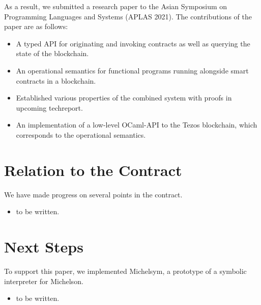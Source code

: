 \documentclass[a4paper,11pt]{article}
\begin{document}
\begin{itemize}
As a result, we submitted a research paper to the Asian Symposium on Programming Languages and Systems (APLAS 2021). The contributions of the paper are as follows:
\begin{itemize}
\item A typed API for originating and invoking contracts as well as querying the
state of the blockchain.
\item An operational semantics for functional programs running alongside smart
contracts in a blockchain.
\item Established various properties of the combined system with proofs in upcoming techreport.
\item An implementation of a low-level OCaml-API to the Tezos blockchain, which corresponds to the operational semantics. 
\end{itemize}
\end{itemize}

\section{Relation to the Contract}
\label{sec:relation-contract}

We have made progress on several points in the contract.
\begin{itemize}
\item to be written.
\end{itemize}

\section{Next Steps}

To support this paper, we implemented Michelsym, a prototype of a symbolic interpreter for Michelson. 
\begin{itemize}
\item  to be written.
\end{itemize}




\end{document}
